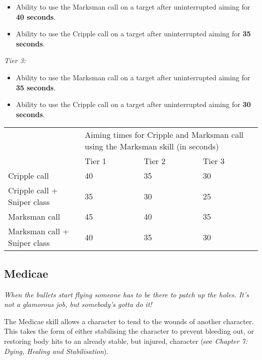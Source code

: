 \documentclass{scrbook}
\begin{document}
\begin{itemize}
\item Ability to use the Marksman call on a target after uninterrupted aiming for \textbf{40 seconds}.

\item Ability to use the Cripple call on a target after uninterrupted aiming for \textbf{35 seconds}.

\end{itemize}
\textit{Tier 3:}

\begin{itemize}
\item Ability to use the Marksman call on a target after uninterrupted aiming for \textbf{35 seconds}.

\item Ability to use the Cripple call on a target after uninterrupted aiming for \textbf{30 seconds}.

\end{itemize}

\begin{table}
\begin{tabular}{|l|l|l|l|} \hline 
\multirow{1}{*}{}& \multicolumn{3}{|l|}{Aiming times for Cripple and Marksman call using the Marksman skill (in seconds)} \\
\cline{2-2}\cline{3-3}\cline{4-4} & Tier 1 & Tier 2 & Tier 3 \\
 \hline Cripple call & 40 & 35 & 30 \\
 \hline Cripple call + Sniper class & 35 & 30 & 25 \\
 \hline Marksman call & 45 & 40 & 35 \\
 \hline Marksman call + Sniper class & 40 & 35 & 30 \\
 \hline \end{tabular}

\end{table}

\subsection{Medicae}

\textit{When the bullets start flying someone has to be there to patch up the holes. It's not a glamorous job, but somebody's gotta do it!}

The Medicae skill allows a character to tend to the wounds of another character. This takes the form of either stabilising the character to prevent bleeding out, or restoring body hits to an already stable, but injured, character (see \textit{Chapter 7: Dying, Healing and Stabilisation}).
\end{document}
